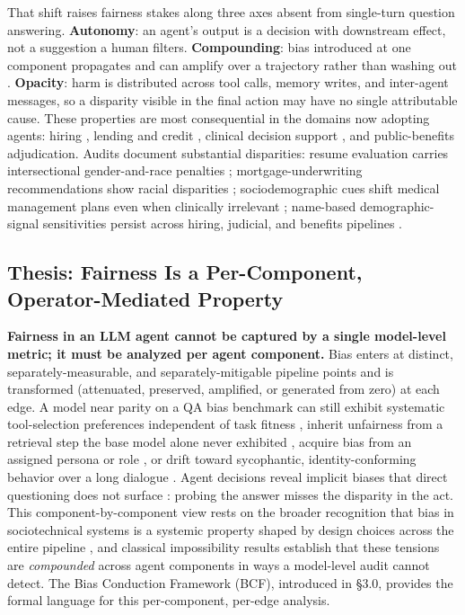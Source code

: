 \documentclass[acmsmall,nonacm]{acmart}
\begin{document}
That shift raises fairness stakes along three axes absent from single-turn question answering. \textbf{Autonomy}: an agent's output is a decision with downstream effect, not a suggestion a human filters. \textbf{Compounding}: bias introduced at one component propagates and can amplify over a trajectory rather than washing out \cite{ma2026implicit,nguyen2025social}. \textbf{Opacity}: harm is distributed across tool calls, memory writes, and inter-agent messages, so a disparity visible in the final action may have no single attributable cause. These properties are most consequential in the domains now adopting agents: hiring \cite{an2025measuring,veldanda2023emily,nghiem2024you}, lending and credit \cite{bowen2024measuring,feng2023empowering,azime2025accept}, clinical decision support \cite{omar2025sociodemographic,zack2024coding,poulain2024bias}, and public-benefits adjudication. Audits document substantial disparities: resume evaluation carries intersectional gender-and-race penalties \cite{an2025measuring}; mortgage-underwriting recommendations show racial disparities \cite{bowen2024measuring}; sociodemographic cues shift medical management plans even when clinically irrelevant \cite{omar2025sociodemographic}; name-based demographic-signal sensitivities persist across hiring, judicial, and benefits pipelines \cite{veldanda2023emily,basu2026names,hu2025llms}.

\subsection{Thesis: Fairness Is a Per-Component, Operator-Mediated Property}

\textbf{Fairness in an LLM agent cannot be captured by a single model-level metric; it must be analyzed per agent component.} Bias enters at distinct, separately-measurable, and separately-mitigable pipeline points and is transformed (attenuated, preserved, amplified, or generated from zero) at each edge. A model near parity on a QA bias benchmark can still exhibit systematic tool-selection preferences independent of task fitness \cite{blankenstein2025biasbusters}, inherit unfairness from a retrieval step the base model alone never exhibited \cite{wu2024rag,hu2024free}, acquire bias from an assigned persona or role \cite{gupta2023bias,cao2026from}, or drift toward sycophantic, identity-conforming behavior over a long dialogue \cite{liu2025truth,ma2026implicit}. Agent decisions reveal implicit biases that direct questioning does not surface \cite{li2025actions}: probing the answer misses the disparity in the act. This component-by-component view rests on the broader recognition that bias in sociotechnical systems is a systemic property shaped by design choices across the entire pipeline \cite{selbst2019fairness,blodgett2020language}, and classical impossibility results \cite{kleinberg2017inherent,chouldechova2017fair} establish that these tensions are \emph{compounded} across agent components in ways a model-level audit cannot detect. The Bias Conduction Framework (BCF), introduced in \S{}3.0, provides the formal language for this per-component, per-edge analysis.
\end{document}
